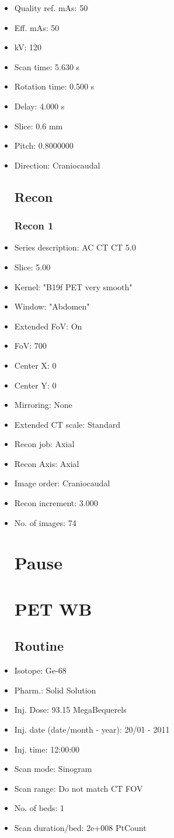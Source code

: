 \documentclass[12pt]{article}
\begin{document}
\begin{itemize}
\subsection{Scan}
\item Quality ref. mAs: 50\item Eff. mAs: 50\item kV: 120\item Scan time: 5.630 s\item Rotation time: 0.500 s\item Delay: 4.000 s\item Slice: 0.6 mm\item Pitch: 0.8000000\item Direction: Craniocaudal
\subsection{Recon}

\subsubsection{Recon 1}
\item Series description: AC CT CT 5.0
\item Slice: 5.00
\item Kernel: "B19f PET very smooth"
\item Window: "Abdomen"
\item Extended FoV: On
\item FoV: 700
\item Center X: 0
\item Center Y: 0
\item Mirroring: None
\item Extended CT scale: Standard
\item Recon job: Axial
\item Recon Axis: Axial
\item Image order: Craniocaudal
\item Recon increment: 3.000
\item No. of images: 74
\section{Pause}

\section{PET WB}
\subsection{Routine}
\item Isotope: Ge-68
\item Pharm.: Solid Solution
\item Inj. Dose: 93.15 MegaBequerels
\item Inj. date (date/month - year): 20/01 - 2011
\item Inj. time: 12:00:00
\item Scan mode: Sinogram
\item Scan range: Do not match CT FOV
\item No. of beds: 1
\item Scan duration/bed: 2e+008 PtCount

\end{itemize}
\end{document}
